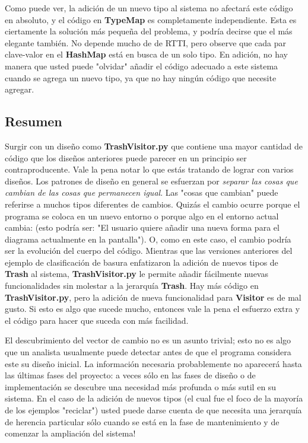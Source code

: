 Como puede ver, la adición de un nuevo tipo al sistema no afectará este código en absoluto, y el código en \textbf{TypeMap} es completamente independiente. Esta es ciertamente la solución más pequeña del problema, y podría decirse que el más elegante también. No depende mucho de de RTTI, pero observe que cada par clave-valor en el \textbf{HashMap} está en busca de un solo tipo. En adición, no hay manera que usted puede "olvidar" añadir el código adecuado a este sistema cuando se agrega un nuevo tipo, ya que no hay ningún código que necesite agregar.       \newline

\subsection*{Resumen}
\label{subsec:Resumen}

Surgir %
con un diseño como \textbf{TrashVisitor.py} que contiene una mayor cantidad de código que los diseños anteriores puede parecer en un principio ser contraproducente. Vale la pena notar lo que estás tratando de lograr con varios diseños. Los patrones de diseño en general se esfuerzan por \textit{separar las cosas que cambian de las cosas que permanecen igual}. Las "cosas que cambian" puede referirse a muchos tipos diferentes de cambios. Quizás el cambio ocurre porque el programa se coloca en un nuevo entorno o porque algo en el entorno actual cambia: (esto podría ser: "El usuario quiere añadir una nueva forma para el diagrama actualmente en la pantalla"). O, como en este caso, el cambio podría ser la evolución del cuerpo del código. Mientras que las versiones anteriores del ejemplo de clasificación de basura enfatizaron la adición de nuevos tipos de \textbf{Trash} al sistema, \textbf{TrashVisitor.py} le permite añadir fácilmente nuevas funcionalidades sin molestar a la jerarquía \textbf{Trash}. Hay más código en \textbf{TrashVisitor.py}, pero la adición de nueva funcionalidad para \textbf{Visitor} es de mal gusto. Si esto es algo que sucede mucho, entonces vale la pena el esfuerzo extra y el código para hacer que suceda con más facilidad.\newline

El descubrimiento del vector de cambio no es un asunto trivial; esto no es algo que un analista usualmente puede detectar antes de que el programa considera este su diseño inicial. La información necesaria probablemente no aparecerá hasta las últimas fases del proyecto: a veces sólo en las fases de diseño o de implementación se descubre una necesidad más profunda o más sutil en su sistema. En el caso de la adición de nuevos tipos (el cual fue el foco de la mayoría de los ejemplos "reciclar") usted puede darse cuenta de que necesita una jerarquía de herencia particular sólo cuando se está en la fase de mantenimiento y de comenzar la ampliación del sistema! \newline

